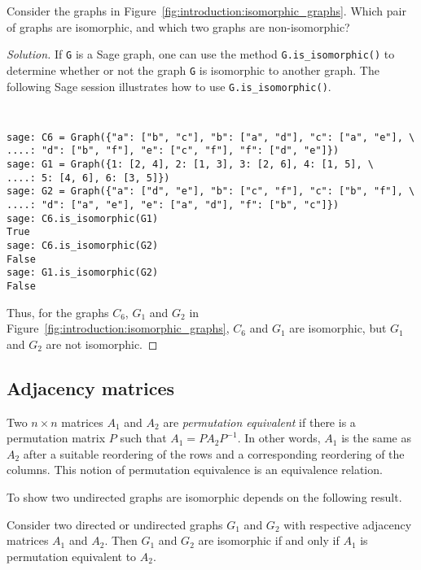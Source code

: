 \begin{exercise}
Consider the graphs in
Figure~\ref{fig:introduction:isomorphic_graphs}. Which pair of graphs
are isomorphic, and which two graphs are non-isomorphic?
\end{exercise}

\begin{proof}[Solution]
If \verb!G! is a Sage graph, one can use the method
\verb!G.is_isomorphic()! to determine whether or not the graph
\verb!G! is isomorphic to another graph. The following Sage session
illustrates how to use \verb!G.is_isomorphic()!.
%
\begin{center}
\fontsize{10pt}{10pt}
\selectfont
\tt
\begin{lstlisting}
sage: C6 = Graph({"a": ["b", "c"], "b": ["a", "d"], "c": ["a", "e"], \
....: "d": ["b", "f"], "e": ["c", "f"], "f": ["d", "e"]})
sage: G1 = Graph({1: [2, 4], 2: [1, 3], 3: [2, 6], 4: [1, 5], \
....: 5: [4, 6], 6: [3, 5]})
sage: G2 = Graph({"a": ["d", "e"], "b": ["c", "f"], "c": ["b", "f"], \
....: "d": ["a", "e"], "e": ["a", "d"], "f": ["b", "c"]})
sage: C6.is_isomorphic(G1)
True
sage: C6.is_isomorphic(G2)
False
sage: G1.is_isomorphic(G2)
False
\end{lstlisting}
\end{center}
%
Thus, for the graphs $C_6$, $G_1$ and $G_2$ in
Figure~\ref{fig:introduction:isomorphic_graphs}, $C_6$ and $G_1$ are
isomorphic, but $G_1$ and $G_2$ are not isomorphic.
\end{proof}



\subsection{Adjacency matrices}

Two $n \times n$ matrices $A_1$ and $A_2$ are
\emph{permutation equivalent} if there is a permutation matrix $P$
such that $A_1 = PA_2P^{-1}$. In other words, $A_1$ is the same as
$A_2$ after a suitable reordering of the rows and a corresponding
reordering of the columns.\index{permutation equivalent} This notion
of permutation equivalence is an equivalence relation.

To show two undirected graphs are isomorphic depends on the following
result.

\begin{theorem}
Consider two directed or undirected graphs $G_1$ and $G_2$ with
respective adjacency matrices $A_1$ and $A_2$. Then $G_1$ and $G_2$
are isomorphic if and only if $A_1$ is permutation equivalent to
$A_2$.
\end{theorem}

